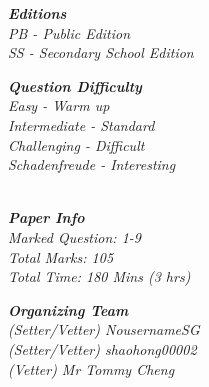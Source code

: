   \begin{multicols*}{2}
    \textit{\textbf{\Large{Editions}} \\
            \large
            \hspace*{12pt} PB - Public Edition \\
            \hspace*{12pt} SS - Secondary School Edition \\
    }

  \textit{\textbf{\Large{Question Difficulty}} \\
          \large
          \hspace*{12pt} Easy - Warm up \\
          \hspace*{12pt} Intermediate - Standard \\
          \hspace*{12pt} Challenging - Difficult \\
          \hspace*{12pt} Schadenfreude - Interesting \\\\
  }

  \textit{\textbf{\Large{Paper Info}} \\
          \large
          \hspace*{12pt} Marked Question: 1-9 \\
          \hspace*{12pt} Total Marks: 105 \\
          \hspace*{12pt} Total Time: 180 Mins (3 hrs) \\
  }

  \textit{\textbf{\Large{Organizing Team}} \\
          \large
          \hspace*{12pt} (Setter/Vetter) NousernameSG \\
          \hspace*{12pt} (Setter/Vetter) shaohong00002 \\
          \hspace*{12pt} (Vetter) \hspace*{38pt} Mr Tommy Cheng \\
  }
  \end{multicols*}

\newpage



